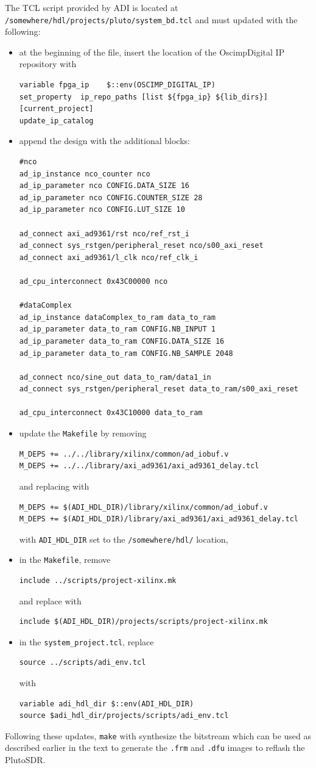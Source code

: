 \documentclass[12pt,oneside]{article}
\begin{document}
The TCL script provided by ADI is located at {\tt /somewhere/hdl/projects/pluto/system\_bd.tcl} and
must updated with the following:
\begin{itemize}
\item at the beginning of the file, insert the location of the OscimpDigital IP repository with
{\footnotesize
\begin{verbatim}
variable fpga_ip    $::env(OSCIMP_DIGITAL_IP)
set_property  ip_repo_paths [list ${fpga_ip} ${lib_dirs}] [current_project]
update_ip_catalog
\end{verbatim}
}
\item append the design with the additional blocks:
{\footnotesize
\begin{verbatim}
#nco
ad_ip_instance nco_counter nco
ad_ip_parameter nco CONFIG.DATA_SIZE 16
ad_ip_parameter nco CONFIG.COUNTER_SIZE 28
ad_ip_parameter nco CONFIG.LUT_SIZE 10

ad_connect axi_ad9361/rst nco/ref_rst_i
ad_connect sys_rstgen/peripheral_reset nco/s00_axi_reset
ad_connect axi_ad9361/l_clk nco/ref_clk_i

ad_cpu_interconnect 0x43C00000 nco

#dataComplex
ad_ip_instance dataComplex_to_ram data_to_ram
ad_ip_parameter data_to_ram CONFIG.NB_INPUT 1
ad_ip_parameter data_to_ram CONFIG.DATA_SIZE 16
ad_ip_parameter data_to_ram CONFIG.NB_SAMPLE 2048

ad_connect nco/sine_out data_to_ram/data1_in
ad_connect sys_rstgen/peripheral_reset data_to_ram/s00_axi_reset

ad_cpu_interconnect 0x43C10000 data_to_ram
\end{verbatim}
}
\item update the {\tt Makefile} by removing
{\footnotesize
\begin{verbatim}
M_DEPS += ../../library/xilinx/common/ad_iobuf.v
M_DEPS += ../../library/axi_ad9361/axi_ad9361_delay.tcl
\end{verbatim}
}
and replacing with
{\footnotesize
\begin{verbatim}
M_DEPS += $(ADI_HDL_DIR)/library/xilinx/common/ad_iobuf.v
M_DEPS += $(ADI_HDL_DIR)/library/axi_ad9361/axi_ad9361_delay.tcl
\end{verbatim}
}
with {\tt ADI\_HDL\_DIR} set to the {\tt /somewhere/hdl/} location,
\item 
in the {\tt Makefile}, remove
{\footnotesize
\begin{verbatim}
include ../scripts/project-xilinx.mk
\end{verbatim}
}
and replace with
{\footnotesize
\begin{verbatim}
include $(ADI_HDL_DIR)/projects/scripts/project-xilinx.mk
\end{verbatim}
}
\item in the {\tt system\_project.tcl}, replace
{\footnotesize
\begin{verbatim}
source ../scripts/adi_env.tcl
\end{verbatim}
}
with
{\footnotesize
\begin{verbatim}
variable adi_hdl_dir $::env(ADI_HDL_DIR)
source $adi_hdl_dir/projects/scripts/adi_env.tcl
\end{verbatim}
}
\end{itemize}

Following these updates, {\tt make} with synthesize the bitstream which can be
used as described earlier in the text to generate the {\tt .frm} and {\tt .dfu}
images to reflash the PlutoSDR.
\end{document}
